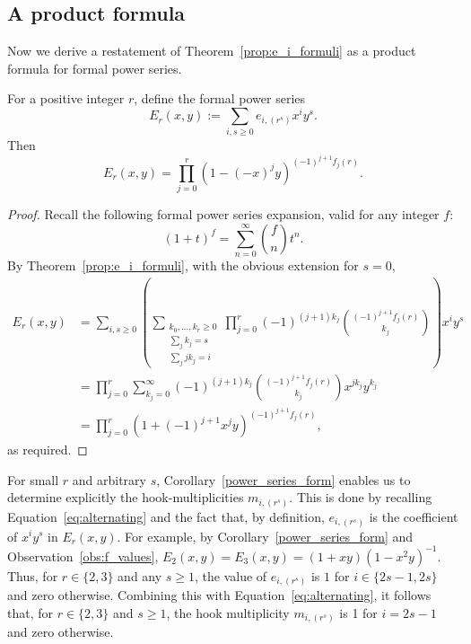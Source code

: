 	
\subsection{A product formula}
\label{sec:prod}
	
Now we derive a restatement of Theorem~\ref{prop:e_i_formuli} as a product formula for formal power series. 

\begin{corollary}\label{power_series_form}
    For a positive integer $r$, define the formal power series
    \[
        E_r(x,y) := \sum_{i,s \ge 0} e_{i,(r^s)} x^i y^s.
    \]
    Then
    \[
        E_r(x,y) 
        = \prod_{j=0}^{r} (1 - (-x)^j y)^{(-1)^{j+1}f_j(r)}.
    \]
\end{corollary}
	
\begin{proof}
    Recall the following formal power series expansion, valid for any integer $f$:
    \[
        (1+t)^{f} = \sum_{n=0}^\infty \binom{f}{n} t^n.
    \]
    By Theorem~\ref{prop:e_i_formuli},
    with the obvious extension for $s=0$,
    \begin{align*}
        E_r(x,y) 
        &= \sum_{i,s \ge 0} \left(
        \sum_{\substack{k_0,\ldots,k_r \ge 0 \\ \sum_j k_j=s \\ \sum_j jk_j = i}} 
        \prod_{j = 0}^{r}
        (-1)^{(j+1)k_j} \binom{(-1)^{j+1} f_j(r)}{k_j}
        \right) x^i y^s \\
        &= \prod_{j=0}^{r} \sum_{k_j=0}^\infty
        (-1)^{(j+1)k_j} \binom{(-1)^{j+1} f_j(r)}{k_j}
        x^{jk_j} y^{k_j} \\
        &= \prod_{j=0}^{r} (1 + (-1)^{j+1} x^j y)^{(-1)^{j+1}f_j(r)},
    \end{align*}
    as required.
\end{proof}
	
\begin{remark}\label{rem:le_3}
    For small $r$ and arbitrary $s$, Corollary~\ref{power_series_form}  enables us to determine explicitly the hook-multiplicities $m_{i,(r^s)}$. 
    This is done by recalling Equation~\eqref{eq:alternating} and the fact that, by definition, $e_{i,(r^s)}$ is the coefficient of $x^i y^s$ in $E_r(x,y)$. 
    For example, by Corollary~\ref{power_series_form} and Observation~\ref{obs:f_values}, 
    $E_2(x,y) = E_3(x,y) = (1+xy)(1-x^2y)^{-1}$. 
    Thus, for $r \in \{2,3\}$ and any $s \ge 1$, the value of $e_{i,(r^s)}$ is $1$ for $i \in \{2s-1,2s\}$ and zero otherwise. 
    Combining this with Equation~\eqref{eq:alternating}, 
    it follows that, for $r \in \{2,3\}$ and $s \ge 1$, the hook multiplicity $m_{i,(r^s)}$ 
    is 1 for $i = 2s-1$ and zero otherwise. 
\end{remark}	


